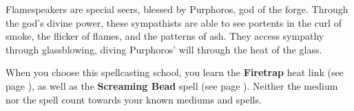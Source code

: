     Flamespeakers are special seers, blessed by Purphoros, god of the forge.
    Through the god's divine power, these sympathists are able to see portents in the curl of smoke, the flicker of flames, and the patterns of ash.
    They access sympathy through glassblowing, diving Purphoros' will through the heat of the glass.

    When you choose this spellcasting school, you learn the \textbf{Firetrap} heat link (see page \pageref{medium::firetrap}), as well as the \textbf{Screaming Bead} spell (see page \pageref{spell::screamingbead}).
    Neither the medium nor the spell count towards your known mediums and spells.


